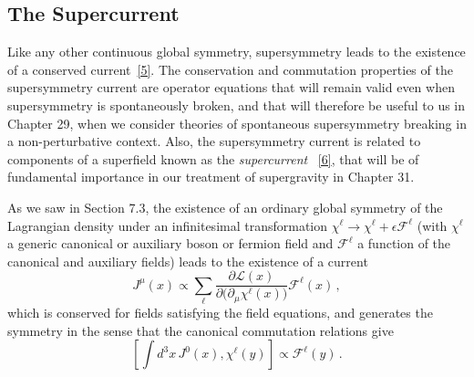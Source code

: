 
\subsection{The Supercurrent}

\providecommand{\SuperD}{\mathcal{D}}
\providecommand{\SuperQ}{\mathcal{Q}}

Like any other continuous global symmetry, supersymmetry leads to the
existence of a conserved current~\hyperref[ch26-ref-5]{[5]}. The conservation
and commutation properties of the supersymmetry current are operator
equations that will remain valid even when supersymmetry is spontaneously
broken, and that will therefore be useful to us in Chapter 29, when we
consider theories of spontaneous supersymmetry breaking in a
non-perturbative context. Also, the supersymmetry current is related to
components of a superfield known as the \emph{supercurrent}%
~\hyperref[ch26-ref-6]{[6]}, that will be of fundamental importance in our
treatment of supergravity in Chapter 31.

As we saw in Section 7.3, the existence of an ordinary global symmetry of the
Lagrangian density under an infinitesimal transformation
\(\chi^\ell\longrightarrow\chi^\ell+\epsilon\mathcal{F}^\ell\) (with
\(\chi^\ell\) a generic canonical or auxiliary boson or fermion field and
\(\mathcal{F}^\ell\) a function of the canonical and auxiliary fields) leads
to the existence of a current
\[
  J^\mu(x)\propto
  \sum_\ell
  \frac{\partial\mathcal{L}(x)}
       {\partial\bigl(\partial_\mu\chi^\ell(x)\bigr)}
  \mathcal{F}^\ell(x)\,,
\]
which is conserved for fields satisfying the field equations, and generates
the symmetry in the sense that the canonical commutation relations give
\[
  \left[
    \int d^3x\,J^0(x),\chi^\ell(y)
  \right]
  \propto\mathcal{F}^\ell(y)\,.
\]

